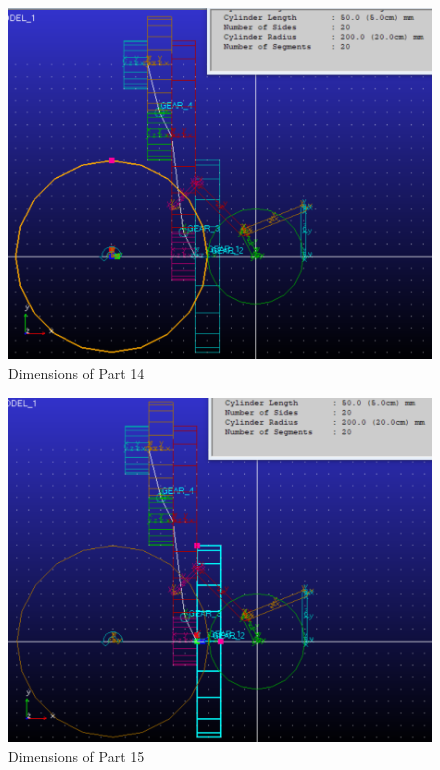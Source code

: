                 \begin{figure}[hbt!]
                    \centering
                    \includegraphics[width=0.9\columnwidth]{Images/dim14.png}
                    \caption{Dimensions of Part 14}
                    \label{fig:dim14}
                \end{figure}

                \begin{figure}[hbt!]
                    \centering
                    \includegraphics[width=0.9\columnwidth]{Images/dim15.png}
                    \caption{Dimensions of Part 15}
                    \label{fig:dim15}
                \end{figure}

